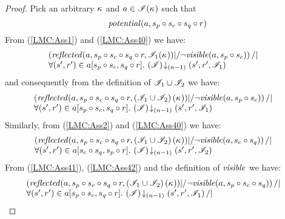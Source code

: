 \begin{lemma}
\begin{proof}
\noindent Pick an arbitrary $\kappa_{}$ and $a \in\mathscr{I}(\kappa_{})$ such that
\begin{equation}
	\mathit{potential}(a, s_p \circ s_c \circ s_q \circ r) \label{LMC:Ass40}
\end{equation}
From (\ref{LMC:Ass1}) and (\ref{LMC:Ass40}) we have: 
%
\begin{align*}
	& 
	\begin{array}{@{} l @{}}
		\left( \m{reflected}(a,s_p \composeL s_c \composeL s_q \composeL r,\lmod_1(\ca{})) |/ \neg\m{visible}(a,s_p \composeL s_c) \right) /| \\
		\for{(s', r') \in a[s_p \composeL s_c, s_q \composeL r]} \extendsAMUpto{\lmod}{(n-1)}{s'}{r'}{\lmod_1}
	\end{array}	  
\end{align*}
%
and consequently from the definition of $\mathscr{I}_1 \cup \mathscr{I}_2$ we have: 
%
\begin{align}
	& \begin{array}{@{} l @{}}
		\left( \m{reflected}(a,s_p \composeL s_c \composeL s_q \composeL r, \left(\lmod_1 \cup \lmod_2 \right)(\ca{})) |/ \neg\m{visible}(a,s_p \composeL s_c) \right) /| \\
		\for{(s', r') \in a[s_p \composeL s_c, s_q \composeL r]} \extendsAMUpto{\lmod}{(n-1)}{s'}{r'}{\lmod_1}
	\end{array}	  \label{LMC:Ass41}
\end{align}
Similarly, from (\ref{LMC:Ass2}) and (\ref{LMC:Ass40}) we have: 
%
\begin{align}
	& \begin{array}{@{} l @{}}
		\left( \m{reflected}(a,s_p \composeL s_c \composeL s_q \composeL r, \left(\lmod_1 \cup \lmod_2 \right)(\ca{})) |/ \neg\m{visible}(a,s_c \composeL s_q) \right) /| \\
		\for{(s', r') \in a[s_c \composeL s_q, s_p \composeL r]} \extendsAMUpto{\lmod}{(n-1)}{s'}{r'}{\lmod_2}
	\end{array} \label{LMC:Ass42}
\end{align}
From (\ref{LMC:Ass41}), (\ref{LMC:Ass42}) and the definition of $\mathit{visible}$ we have: 
%
\begin{align}
	& \begin{array}{@{} l @{}}
		\left( \m{reflected}(a,s_p \composeL s_c \composeL s_q \composeL r, \left(\lmod_1 \cup \lmod_2 \right)(\ca{})) |/ \neg\m{visible}(a,s_p \composeL s_c \composeL s_q) \right) /| \\
		\for{(s', r') \in a[s_p \composeL s_c, s_q \composeL r]} \extendsAMUpto{\lmod}{(n-1)}{s'}{r'}{\lmod_1} /| \\

\end{array}
\end{align}
\end{proof}
\end{lemma}
